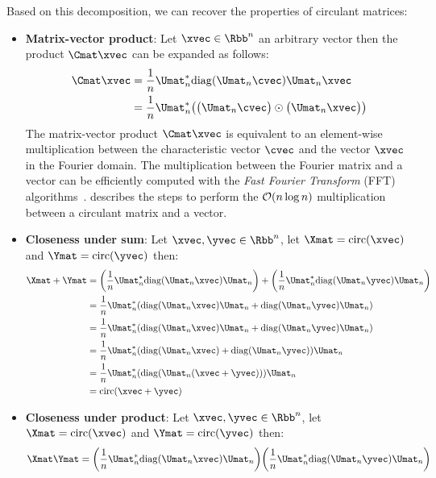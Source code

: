 \noindent
Based on this decomposition, we can recover the properties of circulant matrices:
\begin{itemize}[leftmargin=13pt]
  \item \textbf{Matrix-vector product}: Let $\xvec \in \Rbb^n$ an arbitrary vector then the product $\Cmat \xvec$ can be expanded as follows:
  \begin{align}
    \Cmat \xvec &= \frac{1}{n} \Umat_n^* \diag(\Umat_n \cvec) \Umat_n \xvec  \\
    &= \frac{1}{n} \Umat_n^* \left( \big(\Umat_n \cvec \big) \odot \big( \Umat_n \xvec \big) \right)
  \end{align}
  The matrix-vector product $\Cmat \xvec$ is equivalent to an element-wise multiplication between the characteristic vector $\cvec$ and the vector $\xvec$ in the Fourier domain.
  The multiplication between the Fourier matrix and a vector can be efficiently computed with the \emph{Fast Fourier Transform} (FFT) algorithms~\cite{cooley1965algorithm}.
   describes the steps to perform the $\mathcal{O}(n \log n)$ multiplication between  a circulant matrix and a vector.
  \item \textbf{Closeness under sum}: Let $\xvec, \yvec \in \Rbb^n$, let $\Xmat= \circulant(\xvec)$ and $\Ymat = \circulant(\yvec)$ then:
    \begin{align}
      \Xmat + \Ymat &= \left( \frac{1}{n} \Umat_n^* \diag(\Umat_n \xvec) \Umat_n \right) + \left( \frac{1}{n} \Umat_n^* \diag(\Umat_n \yvec) \Umat_n \right) \\
      &= \frac{1}{n}  \Umat_n^* \left( \diag(\Umat_n \xvec) \Umat_n  + \diag(\Umat_n \yvec) \Umat_n \right) \\
      &= \frac{1}{n}  \Umat_n^* \left( \diag(\Umat_n \xvec) \Umat_n  + \diag(\Umat_n \yvec) \Umat_n \right) \\
      &= \frac{1}{n}  \Umat_n^* \left( \diag(\Umat_n \xvec) + \diag(\Umat_n \yvec) \right) \Umat_n  \\
      &= \frac{1}{n}  \Umat_n^* \left( \diag(\Umat_n (\xvec + \yvec)) \right) \Umat_n  \\
      &= \circulant(\xvec + \yvec)
    \end{align}
  \item \textbf{Closeness under product}: Let $\xvec, \yvec \in \Rbb^n$, let $\Xmat= \circulant(\xvec)$ and $\Ymat = \circulant(\yvec)$ then:
    \begin{align}
      \Xmat \Ymat &= \left( \frac{1}{n} \Umat_n^* \diag(\Umat_n \xvec) \Umat_n \right) \left( \frac{1}{n} \Umat_n^* \diag(\Umat_n \yvec) \Umat_n \right) \\

\end{align}
\end{itemize}
